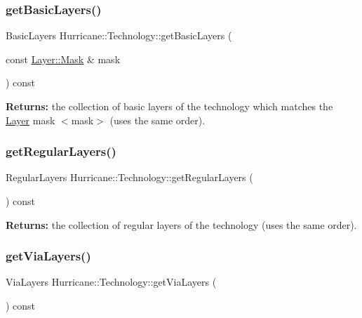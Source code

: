 \subsubsection{\texorpdfstring{get\+Basic\+Layers()}{getBasicLayers()}\hspace{0.1cm}{\footnotesize\ttfamily [2/2]}}
{\footnotesize\ttfamily Basic\+Layers Hurricane\+::\+Technology\+::get\+Basic\+Layers (\begin{DoxyParamCaption}\item[{const \mbox{\hyperlink{classHurricane_1_1Layer_af5277c670637bd5d910237e7afe01a91}{Layer\+::\+Mask}} \&}]{mask }\end{DoxyParamCaption}) const}

{\bfseries Returns\+:} the collection of basic layers of the technology which matches the \mbox{\hyperlink{classHurricane_1_1Layer}{Layer}} mask {\ttfamily $<$mask$>$} (uses the same order). \mbox{\label{classHurricane_1_1Technology_abffce542bc1cee054b4a09c64449f3b8}} 
\subsubsection{\texorpdfstring{get\+Regular\+Layers()}{getRegularLayers()}}
{\footnotesize\ttfamily Regular\+Layers Hurricane\+::\+Technology\+::get\+Regular\+Layers (\begin{DoxyParamCaption}{ }\end{DoxyParamCaption}) const}

{\bfseries Returns\+:} the collection of regular layers of the technology (uses the same order). \mbox{\label{classHurricane_1_1Technology_aacde973f6a02a232a01f3f618576e1ee}} 
\subsubsection{\texorpdfstring{get\+Via\+Layers()}{getViaLayers()}}
{\footnotesize\ttfamily Via\+Layers Hurricane\+::\+Technology\+::get\+Via\+Layers (\begin{DoxyParamCaption}{ }\end{DoxyParamCaption}) const}


